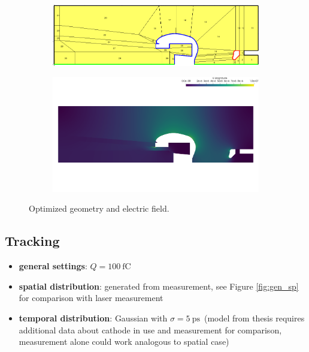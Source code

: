 \begin{center}
\begin{figure}[H]
   \begin{subfigure}{0.45\textwidth}
      \includegraphics[width=\textwidth]{fig/geometry_v6_opt_order=3_run2}
   \end{subfigure}
   \begin{subfigure}{0.45\textwidth}
      \includegraphics[width=\textwidth]{fig/E_v6_opt_order=3_run2}
   \end{subfigure}
   \caption{Optimized geometry and electric field.}
   \label{fig:opt}
\end{figure}
\end{center}

\newpage

\subsection{Tracking}
\begin{itemize}
   \item \textbf{general settings}: $Q=100\ \mathrm{fC}$
   \item \textbf{spatial distribution}: generated from measurement, see Figure \ref{fig:gen_sp} for comparison with laser measurement
   \item \textbf{temporal distribution}: Gaussian with $\sigma=5\ \mathrm{ps}$\ (model from thesis requires additional data about cathode in use and measurement for comparison, measurement alone could work analogous to spatial case)
\end{itemize}

